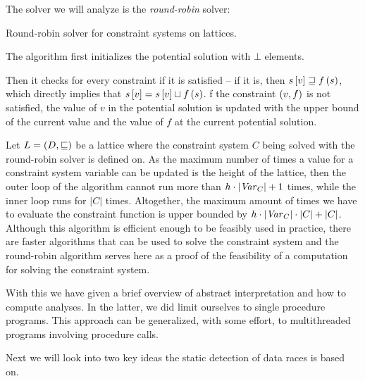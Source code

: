\documentclass[..thesis.tex]{subfiles}
\begin{document}
The solver we will analyze is the \textit{round-robin} solver:


\begin{algorithm}[H]
\label{round-robin}
\caption{Round-robin solver for constraint systems on lattices.}
\end{algorithm}
The algorithm first initializes the potential solution with $\bot$ elements.

Then it checks for every constraint if it is satisfied -- if it is, then $s \left[ v \right] \sqsupseteq f \left( s \right)$,
which directly implies that $s \left[ v \right] = s \left[ v \right] \sqcup f \left( s \right)$. 
f the constraint $\left( v, f \right)$  is not satisfied, the value of $v$ in the potential solution is updated with the upper bound of the current
value and the value of $f$ at the current potential solution.

Let $L = \left( D, \sqsubseteq \right)$ be a lattice where the constraint system $C$ being solved with the round-robin solver is defined on.
As the maximum number of times a value for a constraint system variable can be updated is the height of the lattice,
then the outer loop of the algorithm cannot run more than $h \cdot \left| \mathit{Var}_C \right| + 1$ times, while the inner loop runs for $\left| C \right|$ times.
Altogether, the maximum amount of times we have to evaluate the constraint function is upper bounded by $h \cdot \left| \mathit{Var}_C \right| \cdot \left| C \right| + \left| C \right|$.
Although this algorithm is efficient enough to be feasibly used in practice,
there are faster algorithms that can be used to solve the constraint system and
the round-robin algorithm serves here as a proof of the feasibility of a computation for solving the constraint system.

With this we have given a brief overview of abstract interpretation and how to compute analyses. In the latter,
we did limit ourselves to single procedure programs. This approach can be generalized, with some effort, to multithreaded programs involving procedure calls.

Next we will look into two key ideas the static detection of data races is based on.
\end{document}
